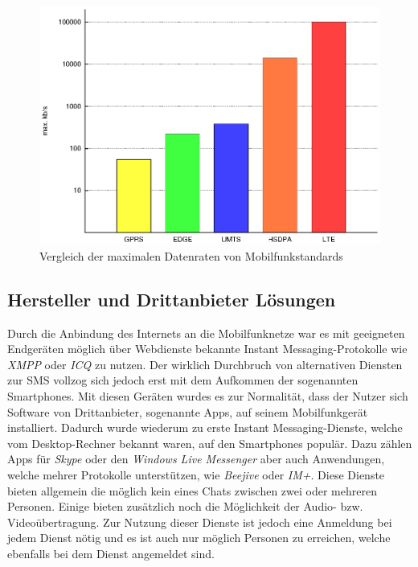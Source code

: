 \documentclass[german,12pt,a4paper]{article}
\begin{document}
 \begin{figure}
     \centering
     \includegraphics[width=\textwidth]{plot/datenraten}
     \caption{Vergleich der maximalen Datenraten von Mobilfunkstandards}
     \label{fig:datenraten}
 \end{figure}


 \subsection{Hersteller und Drittanbieter Lösungen} %
 \label{sub:drittanbieter}


 Durch die Anbindung des Internets an die Mobilfunknetze war es mit geeigneten Endgeräten
 möglich über Webdienste bekannte Instant Messaging-Protokolle wie \textit{XMPP} oder
 \textit{ICQ} zu nutzen. Der
 wirklich Durchbruch von alternativen Diensten zur SMS vollzog sich jedoch erst mit dem
 Aufkommen der sogenannten \glqq{}Smartphones\grqq{}. Mit diesen Geräten wurdes es zur Normalität,
 dass der Nutzer sich Software von Drittanbieter, sogenannte \glqq{}Apps\grqq{}, auf
 seinem Mobilfunkgerät installiert. Dadurch wurde wiederum zu erste Instant Messaging-Dienste,
 welche vom Desktop-Rechner bekannt waren, auf den Smartphones populär. Dazu zählen Apps für
 \textit{Skype} oder den \textit{Windows Live Messenger} aber auch Anwendungen, welche mehrer Protokolle
 unterstützen, wie \textit{Beejive} oder \textit{IM+}. Diese Dienste bieten allgemein die
 möglich kein eines Chats zwischen zwei oder mehreren Personen. Einige bieten zusätzlich noch die
 Möglichkeit der Audio- bzw. Videoübertragung. Zur Nutzung dieser Dienste ist jedoch eine
 Anmeldung bei jedem Dienst nötig und es ist auch nur möglich Personen zu erreichen, welche
 ebenfalls bei dem Dienst angemeldet sind.
\end{document}

